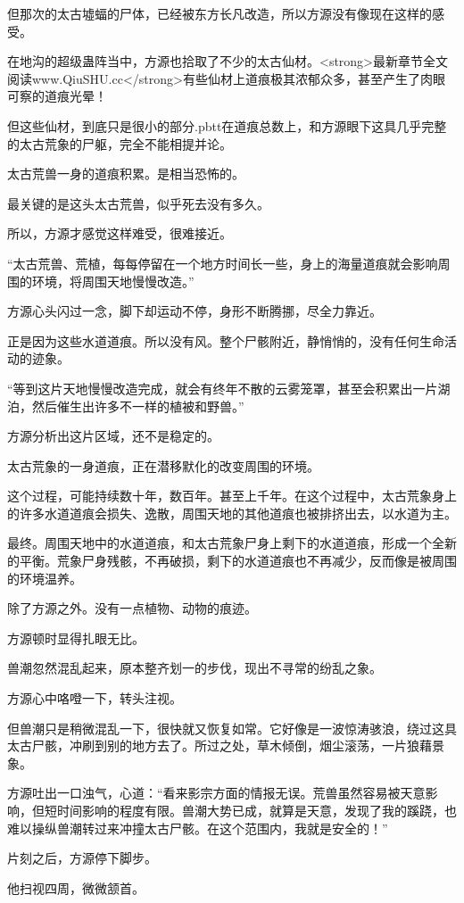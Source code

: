 \begin{this_body}
但那次的太古墟蝠的尸体，已经被东方长凡改造，所以方源没有像现在这样的感受。

在地沟的超级蛊阵当中，方源也拾取了不少的太古仙材。<strong>最新章节全文阅读www.QiuSHU.cc</strong>有些仙材上道痕极其浓郁众多，甚至产生了肉眼可察的道痕光晕！

但这些仙材，到底只是很小的部分.pbtt在道痕总数上，和方源眼下这具几乎完整的太古荒象的尸躯，完全不能相提并论。

太古荒兽一身的道痕积累。是相当恐怖的。

最关键的是这头太古荒兽，似乎死去没有多久。

所以，方源才感觉这样难受，很难接近。

“太古荒兽、荒植，每每停留在一个地方时间长一些，身上的海量道痕就会影响周围的环境，将周围天地慢慢改造。”

方源心头闪过一念，脚下却运动不停，身形不断腾挪，尽全力靠近。

正是因为这些水道道痕。所以没有风。整个尸骸附近，静悄悄的，没有任何生命活动的迹象。

“等到这片天地慢慢改造完成，就会有终年不散的云雾笼罩，甚至会积累出一片湖泊，然后催生出许多不一样的植被和野兽。”

方源分析出这片区域，还不是稳定的。

太古荒象的一身道痕，正在潜移默化的改变周围的环境。

这个过程，可能持续数十年，数百年。甚至上千年。在这个过程中，太古荒象身上的许多水道道痕会损失、逸散，周围天地的其他道痕也被排挤出去，以水道为主。

最终。周围天地中的水道道痕，和太古荒象尸身上剩下的水道道痕，形成一个全新的平衡。荒象尸身残骸，不再破损，剩下的水道道痕也不再减少，反而像是被周围的环境温养。

除了方源之外。没有一点植物、动物的痕迹。

方源顿时显得扎眼无比。

兽潮忽然混乱起来，原本整齐划一的步伐，现出不寻常的纷乱之象。

方源心中咯噔一下，转头注视。

但兽潮只是稍微混乱一下，很快就又恢复如常。它好像是一波惊涛骇浪，绕过这具太古尸骸，冲刷到别的地方去了。所过之处，草木倾倒，烟尘滚荡，一片狼藉景象。

方源吐出一口浊气，心道：“看来影宗方面的情报无误。荒兽虽然容易被天意影响，但短时间影响的程度有限。兽潮大势已成，就算是天意，发现了我的蹊跷，也难以操纵兽潮转过来冲撞太古尸骸。在这个范围内，我就是安全的！”

片刻之后，方源停下脚步。

他扫视四周，微微颔首。


\end{this_body}
